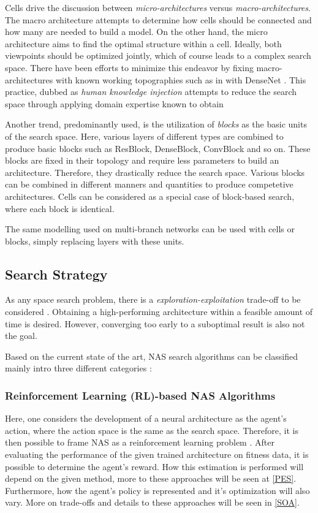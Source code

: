\documentclass[10pt,        %
               a4paper,     %
               journal,     %
               ]{IEEEtran}
\begin{document}
Cells drive the discussion between \textit{micro-architectures} versus \textit{macro-architectures}. The macro architecture
attempts to determine how cells should be connected and how many are needed to build a model. On the other hand, the micro
architecture aims to find the optimal structure within a cell. Ideally, both viewpoints should be optimized jointly, which of course
leads to a complex search space. There have been efforts to minimize this endeavor by fixing macro-architectures with
known working topographies such as in \cite{pmlr-v80-cai18a} with DenseNet \cite{Huang_2017_CVPR}. This practice, dubbed as
\textit{human knowledge injection} attempts to reduce the search space through applying domain expertise known to obtain

Another trend, predominantly used, is the utilization of \textit{blocks} as the basic units of the search space. Here, various layers of different types
are combined to produce basic blocks such as ResBlock, DenseBlock, ConvBlock and so on. These blocks are fixed in their topology
and require less parameters to build an architecture. Therefore, they drastically reduce the search space. Various blocks can be combined
in different manners and quantities to produce competetive architectures. Cells can be considered as a special case of block-based
search, where each block is identical.

The same modelling used on multi-branch networks can be used with cells or blocks, simply replacing layers with
these units.


\subsection{Search Strategy}
As any space search problem, there is a \textit{exploration-exploitation} trade-off to be considered \cite{elsken2019neural}.
Obtaining a high-performing architecture within a feasible amount of time is desired. However, converging too early to a
suboptimal result is also not the goal.

Based on the current state of the art, NAS search algorithms can be classified mainly intro three different
categories \cite{liu2021survey}:

\subsubsection{\textbf{Reinforcement Learning} (RL)-based NAS Algorithms}
Here, one considers the development of a neural architecture as the agent's action, where the action space is the same as
the search space. Therefore, it is then possible to frame NAS as a reinforcement learning problem \cite{elsken2019neural}.
After evaluating the performance of the given trained architecture on fitness data, it is possible to
determine the agent's reward. How this estimation is performed will depend on the given method, more to these
approaches will be seen at \ref{PES}. Furthermore, how the agent's policy is represented and it's optimization will
also vary. More on trade-offs and details to these approaches will be seen in \ref{SOA}.
\end{document}
